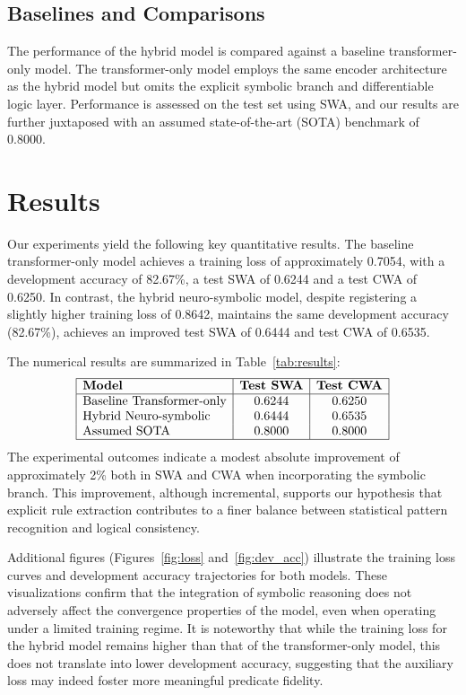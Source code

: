 \documentclass{article}
\begin{document}
\subsection{Baselines and Comparisons}
The performance of the hybrid model is compared against a baseline transformer-only model. The transformer-only model employs the same encoder architecture as the hybrid model but omits the explicit symbolic branch and differentiable logic layer. Performance is assessed on the test set using SWA, and our results are further juxtaposed with an assumed state-of-the-art (SOTA) benchmark of 0.8000.

\section{Results}
Our experiments yield the following key quantitative results. The baseline transformer-only model achieves a training loss of approximately 0.7054, with a development accuracy of 82.67\%, a test SWA of 0.6244 and a test CWA of 0.6250. In contrast, the hybrid neuro-symbolic model, despite registering a slightly higher training loss of 0.8642, maintains the same development accuracy (82.67\%), achieves an improved test SWA of 0.6444 and test CWA of 0.6535.

The numerical results are summarized in Table~\ref{tab:results}:
\[
\begin{array}{|l|c|c|}
\hline
\textbf{Model} & \textbf{Test SWA} & \textbf{Test CWA} \\
\hline
\text{Baseline Transformer-only} & 0.6244 & 0.6250 \\
\text{Hybrid Neuro-symbolic} & 0.6444 & 0.6535 \\
\text{Assumed SOTA} & 0.8000 & 0.8000 \\
\hline
\end{array}
\]
The experimental outcomes indicate a modest absolute improvement of approximately 2\% both in SWA and CWA when incorporating the symbolic branch. This improvement, although incremental, supports our hypothesis that explicit rule extraction contributes to a finer balance between statistical pattern recognition and logical consistency.

Additional figures (Figures~\ref{fig:loss} and~\ref{fig:dev_acc}) illustrate the training loss curves and development accuracy trajectories for both models. These visualizations confirm that the integration of symbolic reasoning does not adversely affect the convergence properties of the model, even when operating under a limited training regime. It is noteworthy that while the training loss for the hybrid model remains higher than that of the transformer-only model, this does not translate into lower development accuracy, suggesting that the auxiliary loss may indeed foster more meaningful predicate fidelity.
\end{document}
